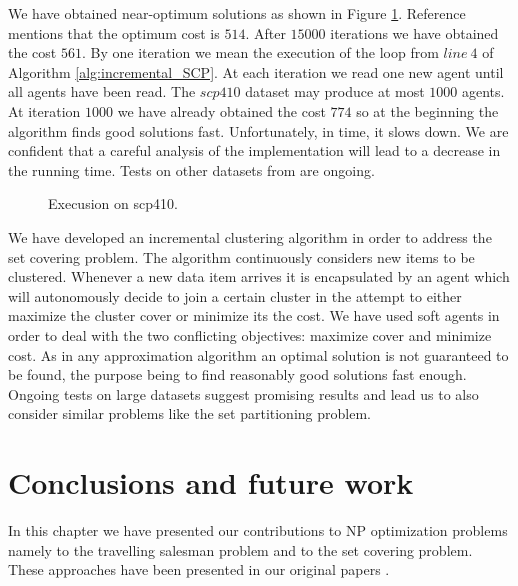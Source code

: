 We have obtained near-optimum solutions as shown in Figure \ref{fig:scp410fig1}. Reference \cite{Crawford11AHybrid} mentions that the optimum cost is $514$. After $15000$ iterations we have obtained the cost $561$. By one iteration we mean the execution of the loop from $line~4$ of Algorithm \ref{alg:incremental_SCP}. At each iteration we read one new agent until all agents have been read. The $scp410$ dataset may produce at most $1000$ agents. At iteration $1000$ we have already obtained the cost $774$ so at the beginning the algorithm finds good solutions fast. Unfortunately, in time, it slows down. We are confident that a careful analysis of the implementation will lead to a decrease in the running time. Tests on other datasets from \cite{website:scp} are ongoing.

\begin{figure}[h!]
\centerline{}
      \caption{Execusion on scp410. }
\label{fig:scp410fig1}
\end{figure}


We have developed an incremental clustering algorithm in order to address the set covering problem. The algorithm continuously considers new items to be clustered. Whenever a new data item arrives it is encapsulated by an agent which will autonomously decide to join a certain cluster in the attempt to either maximize the cluster cover or minimize its the cost. We have used soft agents in order to deal with the two conflicting objectives: maximize cover and minimize cost. As in any approximation algorithm an optimal solution is not guaranteed to be found, the purpose being to find reasonably good solutions fast enough. Ongoing tests on large datasets \cite{website:scp} suggest promising results and lead us to also consider similar problems like the set partitioning problem.

\section{Conclusions and future work}
\label{sec:scpconcfw}

In this chapter we have presented our contributions to NP optimization problems namely to the travelling salesman problem and to the set covering problem. These approaches have been presented in our original papers \cite{Chira07Stigmergic, Gaceanu12SCP}.

